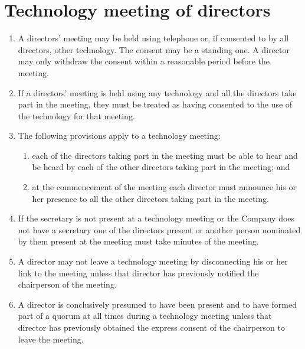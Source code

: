 \section{Technology meeting of directors}

\begin{enumerate}[label=(\alph*)]
    \item A directors' meeting may be held using telephone or, if consented to by all directors, other technology. The consent may be a standing one. A director may only withdraw the consent within a reasonable period before the meeting.
    
    \item If a directors' meeting is held using any technology and all the directors take part in the meeting, they must be treated as having consented to the use of the technology for that meeting.
    
    \item The following provisions apply to a technology meeting:
    \begin{enumerate}[label=(\roman*)]
        \item each of the directors taking part in the meeting must be able to hear and be heard by each of the other directors taking part in the meeting; and
        \item at the commencement of the meeting each director must announce his or her presence to all the other directors taking part in the meeting.
    \end{enumerate}
    
    \item If the secretary is not present at a technology meeting or the Company does not have a secretary one of the directors present or another person nominated by them present at the meeting must take minutes of the meeting.
    
    \item A director may not leave a technology meeting by disconnecting his or her link to the meeting unless that director has previously notified the chairperson of the meeting.
    
    \item A director is conclusively presumed to have been present and to have formed part of a quorum at all times during a technology meeting unless that director has previously obtained the express consent of the chairperson to leave the meeting.
\end{enumerate} 